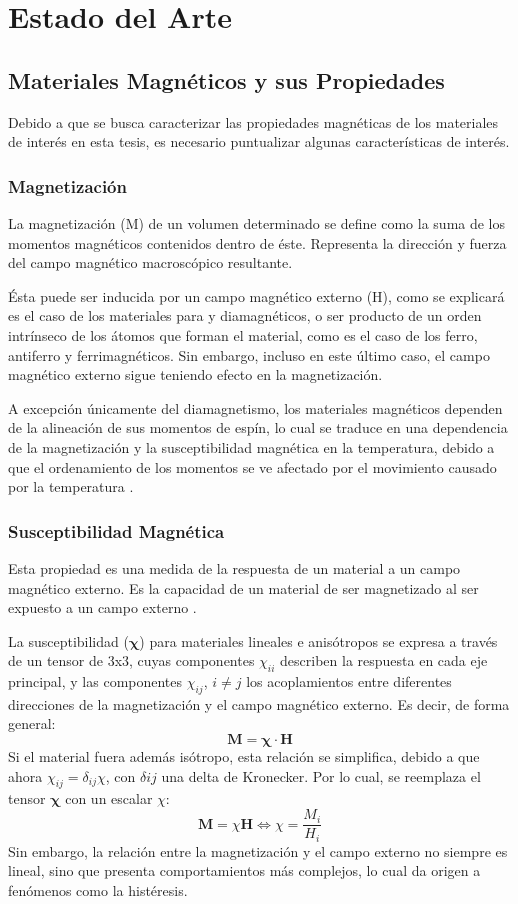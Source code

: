 \documentclass[../main.tex]{subfiles}
\begin{document}
\chapter{Estado del Arte}
\section{Materiales Magnéticos y sus Propiedades}
Debido a que se busca caracterizar las propiedades magnéticas de los materiales de interés en esta tesis, es necesario puntualizar algunas características de interés.
\subsection{Magnetización}
La magnetización (M) de un volumen determinado se define como la suma de los momentos magnéticos contenidos dentro de éste. Representa la dirección y fuerza del campo magnético macroscópico resultante.

Ésta puede ser inducida por un campo magnético externo (H), como se explicará es el caso de los materiales para y diamagnéticos, o ser producto de un orden intrínseco de los átomos que forman el material, como es el caso de los ferro, antiferro y ferrimagnéticos. Sin embargo, incluso en este último caso, el campo magnético externo sigue teniendo efecto en la magnetización.

A excepción únicamente del diamagnetismo, los materiales magnéticos dependen de la alineación de sus momentos de espín, lo cual se traduce en una dependencia de la magnetización y la susceptibilidad magnética en la temperatura, debido a que el ordenamiento de los momentos se ve afectado por el movimiento causado por la temperatura \cite{coey2010magnetism}.
\subsection{Susceptibilidad Magnética}
Esta propiedad es una medida de la respuesta de un material a un campo magnético externo. Es la capacidad de un material de ser magnetizado al ser expuesto a un campo externo \cite{coey2010magnetism}.

La susceptibilidad ($\pmb{\chi}$) para materiales lineales e anisótropos se expresa a través de un tensor de 3x3, cuyas componentes $\chi_{ii}$ describen la respuesta en cada eje principal, y las componentes $\chi_{ij}$, $i\neq j$ los acoplamientos entre diferentes direcciones de la magnetización y el campo magnético externo. Es decir, de forma general:
$$\pmb{M}=\pmb{\chi}\cdot\pmb{H}$$
Si el material fuera además isótropo, esta relación se simplifica, debido a que ahora $\chi_{ij}=\delta_{ij}\chi$, con $\delta{ij}$ una delta de Kronecker. Por lo cual, se reemplaza el tensor $\pmb{\chi}$ con un escalar $\chi$:
$$\pmb{M}=\chi\pmb{H}\iff\chi=\dfrac{M_i}{H_i}$$
Sin embargo, la relación entre la magnetización y el campo externo no siempre es lineal, sino que presenta comportamientos más complejos, lo cual da origen a fenómenos como la histéresis.
\end{document}
